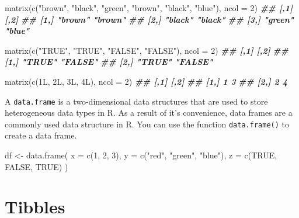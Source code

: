 \documentclass[
]{book}
\newenvironment{Shaded}{\begin{snugshade}}{\end{snugshade}}
\newcommand{\AttributeTok}[1]{\textcolor[rgb]{0.77,0.63,0.00}{#1}}
\newcommand{\ConstantTok}[1]{\textcolor[rgb]{0.00,0.00,0.00}{#1}}
\newcommand{\DecValTok}[1]{\textcolor[rgb]{0.00,0.00,0.81}{#1}}
\newcommand{\DocumentationTok}[1]{\textcolor[rgb]{0.56,0.35,0.01}{\textbf{\textit{#1}}}}
\newcommand{\FunctionTok}[1]{\textcolor[rgb]{0.00,0.00,0.00}{#1}}
\newcommand{\NormalTok}[1]{#1}
\newcommand{\OtherTok}[1]{\textcolor[rgb]{0.56,0.35,0.01}{#1}}
\newcommand{\StringTok}[1]{\textcolor[rgb]{0.31,0.60,0.02}{#1}}
\begin{document}
\begin{Shaded}
\begin{Highlighting}[]
\FunctionTok{matrix}\NormalTok{(}\FunctionTok{c}\NormalTok{(}\StringTok{"brown"}\NormalTok{, }\StringTok{"black"}\NormalTok{, }\StringTok{"green"}\NormalTok{, }\StringTok{"brown"}\NormalTok{, }\StringTok{"black"}\NormalTok{, }\StringTok{"blue"}\NormalTok{), }\AttributeTok{ncol =} \DecValTok{2}\NormalTok{)}
\DocumentationTok{\#\#      [,1]    [,2]   }
\DocumentationTok{\#\# [1,] "brown" "brown"}
\DocumentationTok{\#\# [2,] "black" "black"}
\DocumentationTok{\#\# [3,] "green" "blue"}

\FunctionTok{matrix}\NormalTok{(}\FunctionTok{c}\NormalTok{(}\StringTok{"TRUE"}\NormalTok{, }\StringTok{"TRUE"}\NormalTok{, }\StringTok{"FALSE"}\NormalTok{, }\StringTok{"FALSE"}\NormalTok{), }\AttributeTok{ncol =} \DecValTok{2}\NormalTok{)}
\DocumentationTok{\#\#      [,1]   [,2]   }
\DocumentationTok{\#\# [1,] "TRUE" "FALSE"}
\DocumentationTok{\#\# [2,] "TRUE" "FALSE"}

\FunctionTok{matrix}\NormalTok{(}\FunctionTok{c}\NormalTok{(1L, 2L, 3L, 4L), }\AttributeTok{ncol =} \DecValTok{2}\NormalTok{)}
\DocumentationTok{\#\#      [,1] [,2]}
\DocumentationTok{\#\# [1,]    1    3}
\DocumentationTok{\#\# [2,]    2    4}
\end{Highlighting}
\end{Shaded}

A \texttt{data.frame} is a two-dimensional data structures that are used to store heterogeneous data types in R. As a result of it's convenience, data frames are a commonly used data structure in R. You can use the function \texttt{data.frame()} to create a data frame.

\begin{Shaded}
\begin{Highlighting}[]
\NormalTok{df }\OtherTok{\textless{}{-}} \FunctionTok{data.frame}\NormalTok{(}
  \AttributeTok{x =} \FunctionTok{c}\NormalTok{(}\DecValTok{1}\NormalTok{, }\DecValTok{2}\NormalTok{, }\DecValTok{3}\NormalTok{),}
  \AttributeTok{y =} \FunctionTok{c}\NormalTok{(}\StringTok{"red"}\NormalTok{, }\StringTok{"green"}\NormalTok{, }\StringTok{"blue"}\NormalTok{),}
  \AttributeTok{z =} \FunctionTok{c}\NormalTok{(}\ConstantTok{TRUE}\NormalTok{, }\ConstantTok{FALSE}\NormalTok{, }\ConstantTok{TRUE}\NormalTok{)}
\NormalTok{)}
\end{Highlighting}
\end{Shaded}

\hypertarget{tibbles}{%
\section{Tibbles}\label{tibbles}}
\end{document}
